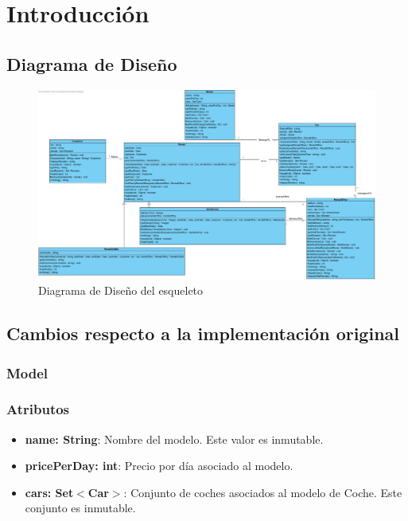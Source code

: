 \section{Introducción}

\subsection{Diagrama de Diseño}

\begin{figure}[H]
    \centering
     \includegraphics[width=1\linewidth]{assets/Esqueleto.jpg}
     \caption{Diagrama de Diseño del esqueleto}
\end{figure}

\subsection{Cambios respecto a la implementación original}

\subsubsection{Model}

\subsubsection*{Atributos}

\begin{itemize}
    \item \textbf{name: String}: Nombre del modelo. Este valor es inmutable.
    \item \textbf{pricePerDay: int}: Precio por día asociado al modelo.
    \item \textbf{cars: Set$<$Car$>$}: Conjunto de coches asociados al modelo de Coche. Este conjunto es  inmutable.
\end{itemize}

